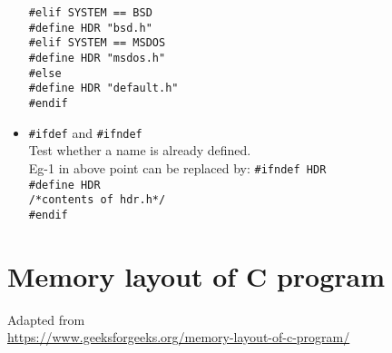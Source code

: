 \begin{multicols*}{3}
\begin{itemize}
\texttt{\#elif SYSTEM == BSD}\\
\qquad \texttt{\#define HDR "bsd.h"}\\
\texttt{\#elif SYSTEM == MSDOS}\\
\qquad \texttt{\#define HDR "msdos.h"}\\
\texttt{\#else}\\
\qquad \texttt{\#define HDR "default.h"}\\
\texttt{\#endif}\\
\item \texttt{\#ifdef}  and \texttt{\#ifndef}\\
Test whether a name is already defined.\\
Eg-1 in above point can be replaced by:
\texttt{\#ifndef HDR}\\
\texttt{\#define HDR}\\
\texttt{/*contents of hdr.h*/ }\\
\texttt{\#endif}\\
\end{itemize}


\vfill \null
\columnbreak 

\section{Memory layout of C program}
Adapted from\\
\url{https://www.geeksforgeeks.org/memory-layout-of-c-program/}\\
\vspace{5pt}


\end{multicols*}
